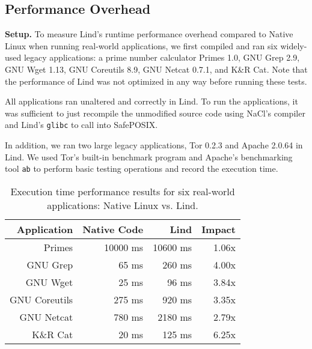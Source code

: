 {{{{\subsection{Performance Overhead}
\label{Performance-Evaluation}


\noindent
\textbf{Setup.}
To measure Lind's runtime performance overhead compared to Native Linux
 when running real-world applications,
we first compiled and ran six widely-used legacy applications:
a prime number calculator Primes 1.0,
GNU Grep 2.9, GNU Wget 1.13, GNU Coreutils 8.9,
GNU Netcat 0.7.1, and K\&R Cat. Note that the performance of Lind
was not optimized in any way before running these tests.

All applications ran unaltered and correctly in Lind. To run the applications,
it was sufficient to just recompile the unmodified
source code using NaCl's compiler and Lind's \texttt{glibc} to call
into SafePOSIX.

In addition, we ran two large legacy applications, Tor 0.2.3 and Apache 2.0.64 in Lind.
We used Tor's built-in benchmark program and Apache's benchmarking tool \texttt{ab} to perform
basic testing operations and record the execution time.

\begin{table}
\centering
\scriptsize
\begin{tabular}{|r|r|r|r|}
  \hline
  {\bf Application} & {\bf Native Code} & {\bf Lind} & {\bf Impact}  \\
  \hline
  Primes & 10000 ms & 10600 ms & 1.06x \\
  GNU Grep & 65 ms & 260 ms & 4.00x \\
  GNU Wget & 25 ms & 96 ms & 3.84x \\
  GNU Coreutils & 275 ms & 920 ms & 3.35x \\
  GNU Netcat & 780 ms & 2180 ms & 2.79x \\
  K\&R Cat & 20 ms & 125 ms & 6.25x \\
  \hline
\end{tabular}
\caption{\small Execution time performance results for six real-world applications: Native
Linux vs. Lind.}
\label{table:performance_apps}
\end{table}

}}}}
